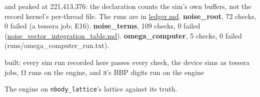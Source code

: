 \begin{description}
and peaked at 221,413,376: the declaration counts the sim's own buffers, not the record kernel's per-thread file. The runs are in \hyperref[chap:ledger]{ledger.md}. \textbf{noise\_\allowbreak{}root}, 72 checks, 0 failed (a tessera job; E16). \textbf{noise\_\allowbreak{}terms}, 109 checks, 0 failed (\hyperref[chap:noise-vector-integration-table]{noise\_\allowbreak{}vector\_\allowbreak{}integration\_\allowbreak{}table.md}). \textbf{omega\_\allowbreak{}computer}, 5 checks, 0 failed (runs/omega\_\allowbreak{}computer\_\allowbreak{}run.txt).
\item[{status}] built; every sim run recorded here passes every check, the device sims as tessera jobs, Ω runs on the engine, and π's BBP digits run on the engine
\item[{next}] The engine on \texttt{nbody\_\allowbreak{}lattice}'s lattice against its truth.
\end{description}

